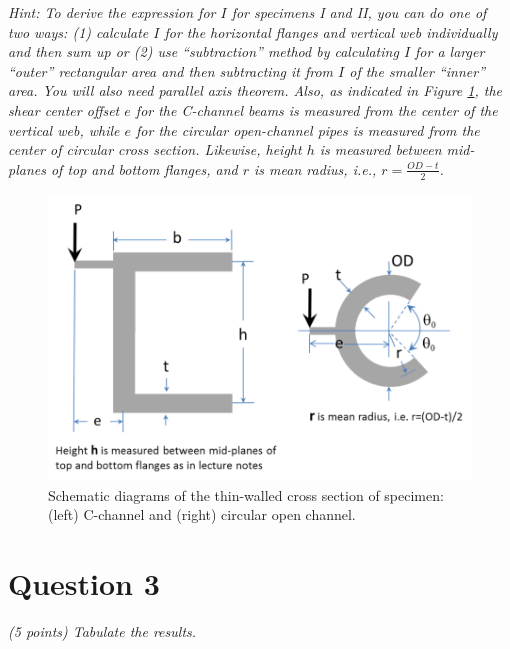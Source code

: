 \documentclass[12 pt]{article}
\newcommand{\ie}{\textit{i}.\textit{e}., }
\begin{document}
\textit{Hint: To derive the expression for $I$ for specimens I and II, you can do one of two ways: (\num{1}) calculate $I$ for the horizontal flanges and vertical web individually and then sum up or (\num{2}) use ``subtraction'' method by calculating $I$ for a larger ``outer'' rectangular area and then subtracting it from $I$ of the smaller ``inner'' area. You will also need parallel axis theorem. Also, as indicated in Figure \ref{fig:question_2_fig}, the shear center offset $e$ for the C-channel beams is measured from the center of the vertical web, while $e$ for the circular open-channel pipes is measured from the center of circular cross section. Likewise, height $h$ is measured between mid-planes of top and bottom flanges, and $r$ is mean radius, \ie $r=\frac{OD-t}{2}$.}

\begin{figure}[htbp]
	\centering
	\includegraphics[width=6in]{images/Question 2 Figure}
	\caption{Schematic diagrams of the thin-walled cross section of specimen: (left) C-channel and (right) circular open channel.}
	\label{fig:question_2_fig}
\end{figure}


\section*{Question 3}
\textit{(\num{5} points) Tabulate the results.}

\end{document}
